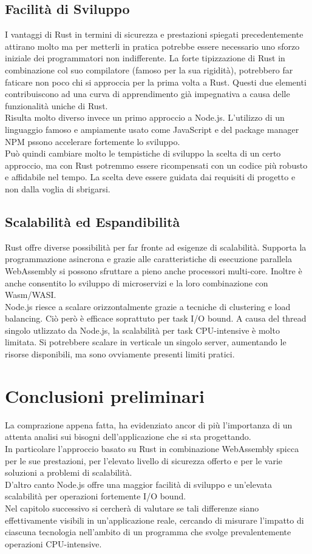 \subsection{Facilità di Sviluppo}
I vantaggi di Rust in termini di sicurezza e prestazioni spiegati precedentemente attirano molto ma per metterli in pratica potrebbe essere necessario uno sforzo iniziale dei programmatori non indifferente.
La forte tipizzazione di Rust in combinazione col suo compilatore (famoso per la sua rigidità), potrebbero far faticare non poco chi si approccia per la prima volta a Rust.
Questi due elementi contribuiscono ad una curva di apprendimento già impegnativa a causa delle funzionalità uniche di Rust.
\\Risulta molto diverso invece un primo approccio a Node.js. L'utilizzo di un linguaggio famoso e ampiamente usato come JavaScript e del package manager NPM pssono accelerare fortemente lo sviluppo.
\\Può quindi cambiare molto le tempistiche di sviluppo la scelta di un certo approccio, ma con Rust potremmo essere ricompensati con un codice più robusto e affidabile nel tempo. La scelta deve essere guidata dai requisiti di progetto e non dalla voglia di sbrigarsi.
\subsection{Scalabilità ed Espandibilità}
Rust offre diverse possibilità per far fronte ad esigenze di scalabilità. 
Supporta la programmazione asincrona e grazie alle caratteristiche di esecuzione parallela WebAssembly si possono sfruttare a pieno anche processori multi-core.
Inoltre è anche consentito lo sviluppo di microservizi e la loro combinazione con Wasm/WASI.
\\Node.js riesce a scalare orizzontalmente grazie a tecniche di clustering e load balancing.
Ciò però è efficace soprattuto per task I/O bound.
A causa del thread singolo utlizzato da Node.js, la scalabilità per task CPU-intensive è molto limitata.
Si potrebbere scalare in verticale un singolo server, aumentando le risorse disponibili, ma sono ovviamente presenti limiti pratici.
\newpage
\section{Conclusioni preliminari}
\label{sec:ConclusioniTecnologie}
La comprazione appena fatta, ha evidenziato ancor di più l'importanza di un attenta analisi sui bisogni dell'applicazione che si sta progettando.
\\In particolare l'approccio basato su Rust in combinazione WebAssembly spicca per le sue prestazioni, per l'elevato livello di sicurezza offerto e per le varie soluzioni a problemi di scalabilità.
\\D'altro canto Node.js offre una maggior facilità di sviluppo e un'elevata scalabilità per operazioni fortemente I/O bound.
\\Nel capitolo successivo si cercherà di valutare se tali differenze siano effettivamente visibili in un'applicazione reale, cercando di misurare l'impatto di ciascuna tecnologia nell'ambito di un programma che svolge prevalentemente operazioni CPU-intensive.